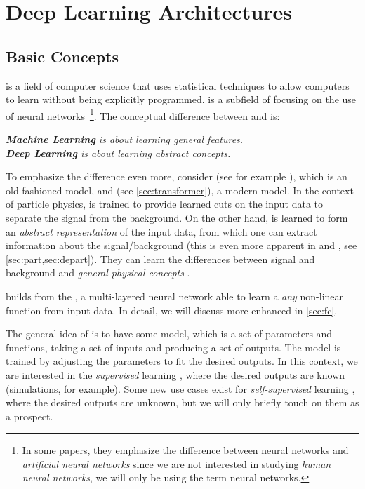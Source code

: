 \chapter{Deep Learning Architectures}
\label{ch:models}

\section{Basic Concepts}
\label{sec:basic_concepts}
\emph{\ml} is a field of computer science that uses statistical techniques to allow computers to learn without being explicitly programmed.
\emph{\dl} is a subfield of \ml focusing on the use of neural networks~\footnote{In some papers, they emphasize the difference between neural networks and \emph{artificial neural networks} since we are not interested in studying \emph{human neural networks}, we will only be using the term neural networks.}.
The conceptual difference between \ml and \dl is:
\begin{center}
    \emph{\textbf{Machine Learning} is about learning general features. \\ \textbf{Deep Learning} is about learning abstract concepts.}
\end{center}

To emphasize the difference even more, consider \bdt (see for example \cite{bdt}), which is an old-fashioned \ml model, and \trans (see \cref{sec:transformer}), a modern \dl model. 
In the context of particle physics, \bdt is trained to provide learned cuts on the input data to separate the signal from the background.
On the other hand, \trans is learned to form an \emph{abstract representation} of the input data, from which one can extract information about the signal/background (this is even more apparent in \ParT and \depart, see \cref{sec:part,sec:depart}).
They can learn the differences between signal and background and \emph{general physical concepts} \cite{qcd_as_nlp}. 

\dl builds from the \mlp \cite{mlp}, a multi-layered neural network able to learn a \emph{any} non-linear function from input data.
In detail, we will discuss more enhanced \mlp in \cref{sec:fc}.

The general idea of \dl is to have some model, which is a set of parameters and functions, taking a set of inputs and producing a set of outputs.
The model is trained by adjusting the parameters to fit the desired outputs.
In this context, we are interested in the \emph{supervised} learning \cite{deeplearningbook}, where the desired outputs are known (\MC simulations, for example).
Some new use cases exist for \emph{self-supervised} learning \cite{masked_autoencoders}, where the desired outputs are unknown, but we will only briefly touch on them as a prospect.

